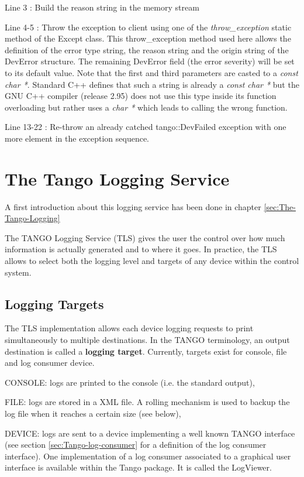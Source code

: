 Line 3 : Build the reason string in the memory stream

Line 4-5 : Throw the exception to client using one of the \emph{throw\_exception}
static method of the Except class. This throw\_exception
method used here allows the definition of the error type string, the
reason string and the origin string of the DevError structure. The
remaining DevError field (the error severity) will be set to its default
value. Note that the first and third parameters are casted to a \emph{const
char {*}}. Standard C++ defines that such a string is already a \emph{const
char {*}} but the GNU C++ compiler (release 2.95) does not use this
type inside its function overloading but rather uses a \emph{char
{*}} which leads to calling the wrong function.

Line 13-22 : Re-throw an already catched tango::DevFailed exception
with one more element in the exception sequence.

\section{The Tango Logging Service \label{The-Tango-Logging chapter}}

A first introduction about this logging service has been done in chapter
\ref{sec:The-Tango-Logging}

The TANGO Logging Service (TLS) gives the user the control over how
much information is actually generated and to where it goes. In practice,
the TLS allows to select both the logging level and targets of any
device within the control system.

\subsection{Logging Targets}

The TLS implementation allows each device logging requests to print
simultaneously to multiple destinations. In the TANGO terminology,
an output destination is called a \textbf{logging target}. Currently,
targets exist for console, file and log consumer device. 

CONSOLE: logs are printed to the console (i.e. the standard output),

FILE: logs are stored in a XML file. A rolling mechanism is used to
backup the log file when it reaches a certain size (see below), 

DEVICE: logs are sent to a device implementing a well known TANGO
interface (see section \ref{sec:Tango-log-consumer} for a definition
of the log consumer interface). One implementation of a log consumer
associated to a graphical user interface is available within the Tango
package. It is called the LogViewer.

